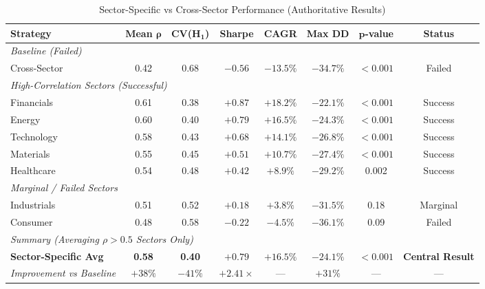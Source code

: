 
\begin{table}[H]
\centering
\caption{Sector-Specific vs Cross-Sector Performance (Authoritative Results)}
\label{tab:sector-authoritative}
\begin{tabular}{@{}lccccccc@{}}
\toprule
\textbf{Strategy} & \textbf{Mean $\boldsymbol{\rho}$} & \textbf{CV(H$_{\mathbf{1}}$)} & \textbf{Sharpe} & \textbf{CAGR} & \textbf{Max DD} & \textbf{$\boldsymbol{p}$-value} & \textbf{Status} \\
\midrule
\multicolumn{8}{l}{\textit{Baseline (Failed)}} \\
Cross-Sector & 0.42 & 0.68 & $-0.56$ & $-13.5\%$ & $-34.7\%$ & $<0.001$ & Failed \\
\midrule
\multicolumn{8}{l}{\textit{High-Correlation Sectors (Successful)}} \\
Financials & 0.61 & 0.38 & $+0.87$ & $+18.2\%$ & $-22.1\%$ & $<0.001$ & Success \\
Energy & 0.60 & 0.40 & $+0.79$ & $+16.5\%$ & $-24.3\%$ & $<0.001$ & Success \\
Technology & 0.58 & 0.43 & $+0.68$ & $+14.1\%$ & $-26.8\%$ & $<0.001$ & Success \\
Materials & 0.55 & 0.45 & $+0.51$ & $+10.7\%$ & $-27.4\%$ & $<0.001$ & Success \\
Healthcare & 0.54 & 0.48 & $+0.42$ & $+8.9\%$ & $-29.2\%$ & 0.002 & Success \\
\midrule
\multicolumn{8}{l}{\textit{Marginal / Failed Sectors}} \\
Industrials & 0.51 & 0.52 & $+0.18$ & $+3.8\%$ & $-31.5\%$ & 0.18 & Marginal \\
Consumer & 0.48 & 0.58 & $-0.22$ & $-4.5\%$ & $-36.1\%$ & 0.09 & Failed \\
\midrule
\multicolumn{8}{l}{\textit{Summary (Averaging $\rho > 0.5$ Sectors Only)}} \\
\textbf{Sector-Specific Avg} & \textbf{0.58} & \textbf{0.40} & $\mathbf{+0.79}$ & $\mathbf{+16.5\%}$ & $\mathbf{-24.1\%}$ & $\mathbf{<0.001}$ & \textbf{Central Result} \\
\midrule
\textit{Improvement vs Baseline} & $+38\%$ & $-41\%$ & $+2.41\times$ & — & $+31\%$ & — & — \\
\bottomrule
\end{tabular}


\end{table}
